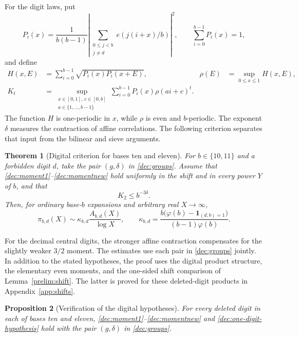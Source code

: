 \documentclass[11pt,a4paper]{article}
\theoremstyle{paperplain}
\newtheorem{theorem}{Theorem}[section]
\newtheorem{proposition}[theorem]{Proposition}
\numberwithin{equation}{section}
\begin{document}
For the digit laws, put
\[
 P_i(x)=\frac1{b(b-1)}
          \left|\sum_{\substack{0\le j<b\\j\ne d}}e(j(i+x)/b)\right|^2,
 \qquad \sum_{i=0}^{b-1}P_i(x)=1,
\]
and define
\begin{align*}
 H(x,E)&=\sum_{i=0}^{b-1}\sqrt{P_i(x)P_i(x+E)},
 &\rho(E)&=\sup_{0\le x\le1}H(x,E),\\
 K_t&=\sup_{\substack{x\in[0,1],\,c\in[0,b]\\a\in\{1,\ldots,b-1\}}}
 \sum_{i=0}^{b-1}P_i(x)\rho(ai+c)^t.
\end{align*}
The function $H$ is one-periodic in $x$, while $\rho$ is even and
$b$-periodic. 
The exponent $\delta$ measures the contraction of affine correlations.
The following criterion separates that input from the bilinear and sieve
arguments.

\begin{theorem}[Digital criterion for bases ten and eleven]
\label{dec:digital-criterion}\label{dec:asymptotic}
For $b\in\{10,11\}$ and a forbidden digit $d$, take the pair
$(g,\delta)$ in \eqref{dec:groups}. Assume that
\eqref{dec:moment1}--\eqref{dec:momentnew} hold uniformly in the shift
and in every power $Y$ of $b$, and that
\begin{equation}\label{dec:one-digit-hypothesis}
 K_2\le b^{-3\delta}.
\end{equation}
Then, for ordinary base-$b$ expansions and arbitrary real $X\to\infty$,
\[
 \pi_{b,d}(X)\sim\kappa_{b,d}\frac{A_{b,d}(X)}{\log X},
 \qquad
 \kappa_{b,d}=\frac{b\bigl(\varphi(b)-\mathbf1_{(d,b)=1}\bigr)}
                    {(b-1)\varphi(b)}.
\]
\end{theorem}

For the decimal central digits, the stronger affine contraction
compensates for the slightly weaker $3/2$ moment. The estimates use
each pair in \eqref{dec:groups} jointly.
In addition to the stated hypotheses, the proof uses the
digital product structure, the elementary even moments, and the
one-sided shift comparison of Lemma~\ref{prelim:shift}.
The latter is proved for these deleted-digit products in
Appendix~\ref{app:shifts}.

\begin{proposition}[Verification of the digital hypotheses]
\label{dec:verified-inputs}\label{eleven:inputs}
For every deleted digit in each of bases ten and eleven,
\eqref{dec:moment1}--\eqref{dec:momentnew} and
\eqref{dec:one-digit-hypothesis} hold with the pair
$(g,\delta)$ in \eqref{dec:groups}.
\end{proposition}
\end{document}
